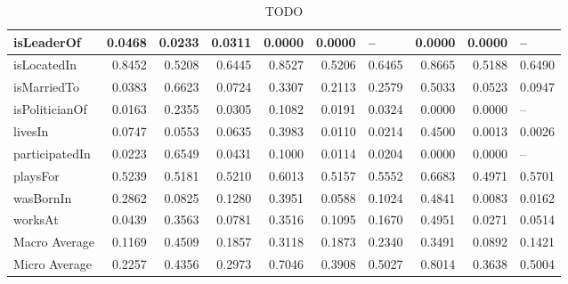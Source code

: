 \begin{table}[htbp]
\begin{tabular}{|l|r|r|r|r|r|r|r|r|r|}
isLeaderOf & 0.0468 & 0.0233 & 0.0311 & 0.0000 & 0.0000 & \multicolumn{1}{l|}{--} & 0.0000 & 0.0000 & \multicolumn{1}{l|}{--} \\ \hline
isLocatedIn & 0.8452 & 0.5208 & 0.6445 & 0.8527 & 0.5206 & 0.6465 & 0.8665 & 0.5188 & 0.6490 \\ \hline
isMarriedTo & 0.0383 & 0.6623 & 0.0724 & 0.3307 & 0.2113 & 0.2579 & 0.5033 & 0.0523 & 0.0947 \\ \hline
isPoliticianOf & 0.0163 & 0.2355 & 0.0305 & 0.1082 & 0.0191 & 0.0324 & 0.0000 & 0.0000 & \multicolumn{1}{l|}{--} \\ \hline
livesIn & 0.0747 & 0.0553 & 0.0635 & 0.3983 & 0.0110 & 0.0214 & 0.4500 & 0.0013 & 0.0026 \\ \hline
participatedIn & 0.0223 & 0.6549 & 0.0431 & 0.1000 & 0.0114 & 0.0204 & 0.0000 & 0.0000 & \multicolumn{1}{l|}{--} \\ \hline
playsFor & 0.5239 & 0.5181 & 0.5210 & 0.6013 & 0.5157 & 0.5552 & 0.6683 & 0.4971 & 0.5701 \\ \hline
wasBornIn & 0.2862 & 0.0825 & 0.1280 & 0.3951 & 0.0588 & 0.1024 & 0.4841 & 0.0083 & 0.0162 \\ \hline
worksAt & 0.0439 & 0.3563 & 0.0781 & 0.3516 & 0.1095 & 0.1670 & 0.4951 & 0.0271 & 0.0514 \\ \hline
Macro Average & 0.1169 & 0.4509 & 0.1857 & 0.3118 & 0.1873 & 0.2340 & 0.3491 & 0.0892 & 0.1421 \\ \hline
Micro Average & 0.2257 & 0.4356 & 0.2973 & 0.7046 & 0.3908 & 0.5027 & 0.8014 & 0.3638 & 0.5004 \\ \hline
\end{tabular}
\caption{TODO}
\label{t:reliability}
\end{table}


